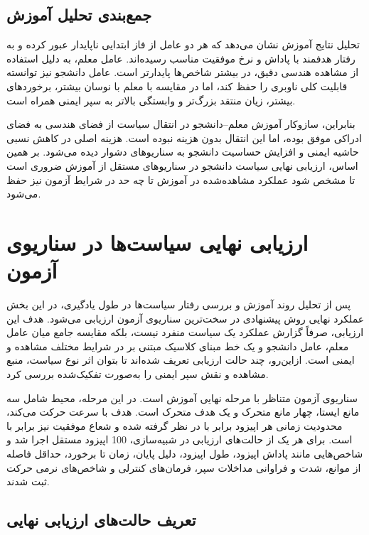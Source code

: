 \subsection{جمع‌بندی تحلیل آموزش}
\label{subsec:training_analysis_summary}

تحلیل نتایج آموزش نشان می‌دهد که هر دو عامل از فاز ابتدایی ناپایدار عبور کرده و به رفتار هدفمند با پاداش و نرخ موفقیت مناسب رسیده‌اند. عامل معلم، به دلیل استفاده از مشاهده هندسی دقیق، در بیشتر شاخص‌ها پایدارتر است. عامل دانشجو نیز توانسته قابلیت کلی ناوبری را حفظ کند، اما در مقایسه با معلم با نوسان بیشتر، برخوردهای بیشتر، زیان منتقد بزرگ‌تر و وابستگی بالاتر به سپر ایمنی همراه است.

بنابراین، سازوکار آموزش معلم--دانشجو در انتقال سیاست از فضای هندسی به فضای ادراکی موفق بوده، اما این انتقال بدون هزینه نبوده است. هزینه اصلی در کاهش نسبی حاشیه ایمنی و افزایش حساسیت دانشجو به سناریوهای دشوار دیده می‌شود. بر همین اساس، ارزیابی نهایی سیاست دانشجو در سناریوهای مستقل از آموزش ضروری است تا مشخص شود عملکرد مشاهده‌شده در آموزش تا چه حد در شرایط آزمون نیز حفظ می‌شود.
\section{ارزیابی نهایی سیاست‌ها در سناریوی آزمون}
\label{sec:final_policy_evaluation}

پس از تحلیل روند آموزش و بررسی رفتار سیاست‌ها در طول یادگیری، در این بخش عملکرد نهایی روش پیشنهادی در سخت‌ترین سناریوی آزمون ارزیابی می‌شود. هدف این ارزیابی، صرفاً گزارش عملکرد یک سیاست منفرد نیست، بلکه مقایسه جامع میان عامل معلم، عامل دانشجو و یک خط مبنای کلاسیک مبتنی بر  در شرایط مختلف مشاهده و ایمنی است. ازاین‌رو، چند حالت ارزیابی تعریف شده‌اند تا بتوان اثر نوع سیاست، منبع مشاهده و نقش سپر ایمنی را به‌صورت تفکیک‌شده بررسی کرد.

سناریوی آزمون متناظر با مرحله نهایی آموزش است. در این مرحله، محیط شامل سه مانع ایستا، چهار مانع متحرک و یک هدف متحرک است. هدف با سرعت  حرکت می‌کند، محدودیت زمانی هر اپیزود برابر با  در نظر گرفته شده و شعاع موفقیت نیز برابر با  است. برای هر یک از حالت‌های ارزیابی در شبیه‌سازی، 100 اپیزود مستقل اجرا شد و شاخص‌هایی مانند پاداش اپیزود، طول اپیزود، دلیل پایان، زمان تا برخورد، حداقل فاصله از موانع، شدت و فراوانی مداخلات سپر، فرمان‌های کنترلی و شاخص‌های نرمی حرکت ثبت شدند.

\subsection{تعریف حالت‌های ارزیابی نهایی}
\label{subsec:final_eval_protocol}

